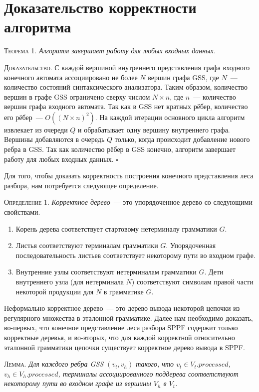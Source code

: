 \clearpage 

\section{Доказательство корректности алгоритма}
\textsc{Теорема 1.} 
\textit{Алгоритм завершает работу для любых входных данных.}

\textsc{Доказательство.}
С каждой вершиной внутреннего представления графа входного конечного автомата ассоциировано не более $N$ вершин графа GSS, где $N$~--- количество состояний синтаксического анализатора. Таким образом, количество вершин в графе GSS ограничено сверху числом $N \times n$, где $n$~--- количество вершин графа входного автомата. Так как в GSS нет кратных рёбер, количество его рёбер~--- $O((N \times n)^{2})$. На каждой итерации основного цикла алгоритм извлекает из очереди $Q$ и обрабатывает одну вершину внутреннего графа. Вершины добавляются в очередь $Q$ только, когда происходит добавление нового ребра в GSS. Так как количество рёбер в GSS конечно, алгоритм завершает работу для любых входных данных. $\square$

Для того, чтобы доказать корректность построения конечного представления леса 
разбора, нам потребуется следующее определение. 

\textsc{Определение 1.} 
\emph{Корректное дерево}~--- это упорядоченное дерево со следующими свойствами.
\begin{enumerate}
  \item Корень дерева соответствует стартовому нетерминалу грамматики $G$.
  \item Листья соответствуют терминалам грамматики $G$. Упорядоченная последовательность листьев соответствует некоторому пути во входном графе.
  \item Внутренние узлы соответствуют нетерминалам грамматики $G$. Дети внутреннего узла (для нетерминала $N$) соответствуют символам правой части некоторой продукции для $N$ в грамматике $G$.
\end{enumerate}

Неформально корректное дерево~--- это дерево вывода некоторой цепочки из 
регулярного множества в эталонной грамматике. Далее нам необходимо доказать, 
во-первых, что конечное представление леса разбора SPPF содержит только 
корректные деревья, и во-вторых, что для каждой корректной относительно 
эталонной грамматики цепочки существует корректное дерево вывода в SPPF. 

\textsc{Лемма.}
\textit{Для каждого ребра GSS $(v_{t}, v_{h})$ такого, что $v_{t} \in V_{t}.processed$, $v_{h} \in V_{h}.processed$, терминалы ассоциированного поддерева соответствуют некоторому пути во входном графе из вершины $V_{h}$ в $V_{t}$.}

